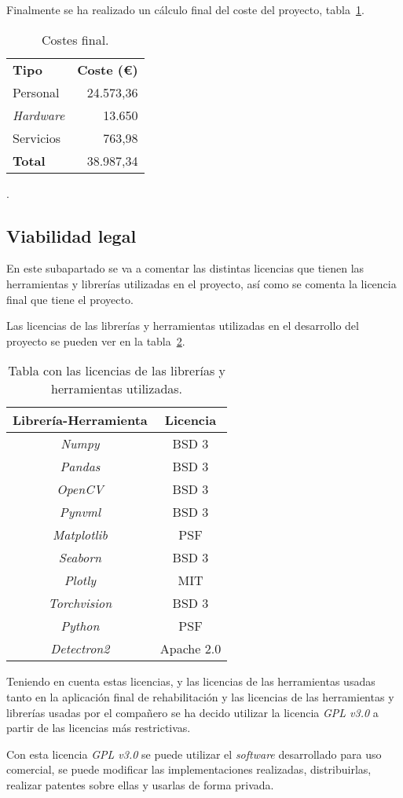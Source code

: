 Finalmente se ha realizado un cálculo final del coste del proyecto, tabla~\ref{tab:coste_final}.

\begin{table}
	\centering
	\begin{tabular}[]{@{}l r@{}}
		\toprule
		\textbf{Tipo} & \textbf{Coste (\euro{})}\\
		\otoprule
		Personal  & 24.573,36 \\
		\textit{Hardware}& 13.650 \\
		Servicios & 763,98\\\hubu
		\textbf{Total}&38.987,34\\
		\bottomrule
	\end{tabular}
	\caption{Costes final.}
	\label{tab:coste_final}.
\end{table}

\subsection{Viabilidad legal}
En este subapartado se va a comentar las distintas licencias que tienen las herramientas y librerías utilizadas en el proyecto, así como se comenta la licencia final que tiene el proyecto.

Las licencias de las librerías y herramientas utilizadas en el desarrollo del proyecto se pueden ver en la tabla~\ref{tab:lic}.

\begin{table}[h]
	\centering
		\begin{tabular}{cc}
			\toprule
			\textbf{Librería-Herramienta}&\textbf{Licencia}\\
			\midrule
			\textit{Numpy} & BSD 3\\
			\textit{Pandas} & BSD 3\\
			\textit{OpenCV}& BSD 3\\
			\textit{Pynvml} & BSD 3\\
			\textit{Matplotlib} &  PSF\\
			\textit{Seaborn} & BSD 3\\
			\textit{Plotly} & MIT\\
			\textit{Torchvision} & BSD 3\\
			\textit{Python} & PSF\\
			\textit{Detectron2}& Apache 2.0\\
			\bottomrule
		\end{tabular}
	\caption{Tabla con las licencias de las librerías y herramientas utilizadas.}
	\label{tab:lic}
\end{table}

Teniendo en cuenta estas licencias, y las licencias de las herramientas usadas tanto en la aplicación final de rehabilitación y las licencias de las herramientas y librerías usadas por el compañero se ha decido utilizar la licencia \textit{GPL v3.0} a partir de las licencias más restrictivas.

Con esta licencia \textit{GPL v3.0} se puede utilizar el \textit{software} desarrollado para uso comercial, se puede modificar las implementaciones realizadas,  distribuirlas, realizar patentes sobre ellas y usarlas de forma privada.
